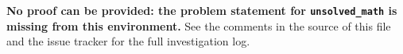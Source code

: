 \documentclass[12pt]{article}
\begin{document}
\textbf{No proof can be provided: the problem statement for
\texttt{unsolved\_math} is missing from this environment.} See the comments in
the source of this file and the issue tracker for the full investigation log.
\end{document}
